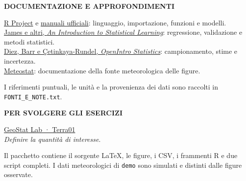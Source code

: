 \documentclass[12pt,aspectratio=1610]{beamer}
\newcommand{\PLabel}[1]{\par{\color{Classical}\bfseries\fontsize{9}{11}\selectfont\MakeUppercase{#1}}\par\vspace{1.8mm}}
\newcommand{\PBody}[1]{\par{\fontsize{11.3}{14.8}\selectfont #1\par}}
\newcommand{\PSmall}[1]{\par{\fontsize{9.8}{13.1}\selectfont #1\par}}
\newcommand{\PCode}[2]{%
\begin{tcolorbox}[enhanced,arc=1.8mm,boxrule=.65pt,
  colback=white,colframe=Classical!75!Navy,colbacktitle=Navy,
  coltitle=white,fonttitle=\bfseries\fontsize{9.6}{12}\selectfont,
  title={#1},left=1.7mm,right=1.3mm,top=1.5mm,bottom=1.3mm,
  before skip=1mm,after skip=1mm]

\end{tcolorbox}}
\newcommand{\PInfo}[1]{%
\begin{tcolorbox}[enhanced,arc=1.6mm,boxrule=.55pt,colback=GeoTint,
 colframe=Rule!80!Classical,left=2.3mm,right=2.3mm,top=2mm,bottom=2mm,
 before skip=1mm,after skip=1mm]
\PSmall{#1}\end{tcolorbox}}
\begin{document}
\begin{lrbox}{\PilotLeftBox}%
\begin{minipage}[t]{10.05cm}\raggedright\color{Ink}\fontsize{11.3}{14.8}\selectfont

\PLabel{Documentazione e approfondimenti}
\PBody{\href{https://www.r-project.org/}{R Project} e \href{https://cran.r-project.org/manuals.html}{manuali ufficiali}: linguaggio, importazione, funzioni e modelli.\\[3mm]
\href{https://www.statlearning.com/}{James e altri, \emph{An Introduction to Statistical Learning}}: regressione, validazione e metodi statistici.\\[3mm]
\href{https://www.openintro.org/book/os/}{Diez, Barr e Çetinkaya-Rundel, \emph{OpenIntro Statistics}}: campionamento, stime e incertezza.\\[3mm]
\href{https://dev.meteostat.net/}{Meteostat}: documentazione della fonte meteorologica delle figure.}
\vspace{3mm}\PSmall{I riferimenti puntuali, le unità e la provenienza dei dati sono raccolti in \texttt{FONTI\_E\_NOTE.txt}.}

\end{minipage}%
\end{lrbox}
\begin{lrbox}{\PilotRightBox}%
\begin{minipage}[t]{7.55cm}\raggedright\color{Ink}\fontsize{11.3}{14.8}\selectfont

\PLabel{Per svolgere gli esercizi}
\PBody{\href{https://marzione00.github.io/Lab_Geo/\#laboratorio/m01-estimando}{GeoStat Lab · Terra01}\\
\emph{Definire la quantità di interesse}.}
\vspace{3mm}\PCode{R · riprendere il lavoro}{85_materiali.R}
\PInfo{Il pacchetto contiene il sorgente LaTeX, le figure, i CSV, i frammenti R e due script completi. I dati meteorologici di \texttt{demo} sono simulati e distinti dalle figure osservate.}

\end{minipage}%
\end{lrbox}
\end{document}
